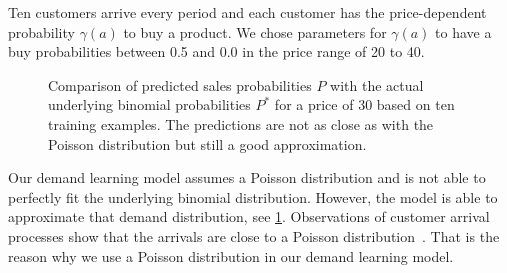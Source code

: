 Ten customers arrive every period and each customer has the price-dependent probability $\gamma(a)$ to buy a product.
We chose parameters for $\gamma(a)$ to have a buy probabilities between 0.5 and 0.0 in the price range of 20 to 40.

\begin{figure}[t]
	\caption[Comparison of Predicted Probabilites with Underlying Binomial Probabilities]{Comparison of predicted sales probabilities $P$ with the actual underlying binomial probabilities $P^*$ for a price of 30 based on ten training examples. The predictions are not as close as with the Poisson distribution but still a good approximation.}
	\label{fig:probs_binom}
\end{figure}

Our demand learning model assumes a Poisson distribution and is not able to perfectly fit the underlying binomial distribution.
However, the model is able to approximate that demand distribution, see \cref{fig:probs_binom}.
Observations of customer arrival processes show that the arrivals are close to a Poisson distribution~\cite{DBLP:journals/ior/Wolff82}.
That is the reason why we use a Poisson distribution in our demand learning model.

